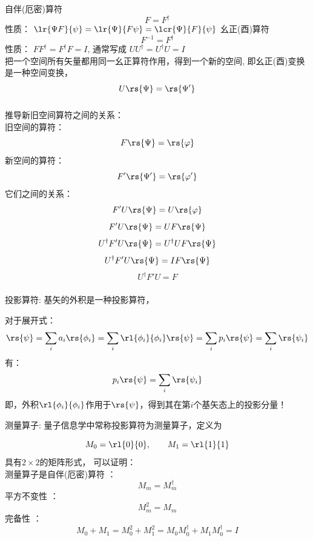 \begin{frame}
    \frametitle{}
    \begin{itemize}
        \Item 自伴(厄密)算符  \[F = F^{\dagger} \] 性质： $\lr{\Psi F}{\psi}=\lr{\Psi }{F \psi}=\lcr{\Psi }{F} {\psi}$
        \Item 幺正(酉)算符    \[F^{-1} = F^{\dagger} \] 性质： $FF^{\dagger}=F^{\dagger}F=I$, 通常写成 $UU^{\dagger}=U^{\dagger}U=I$ \\
        \Tips 把一个空间所有矢量都用同一幺正算符作用，得到一个新的空间, 即幺正(酉)变换是一种空间变换，
        \[U\rs{\Psi} =\rs{\Psi'}\]
    \end{itemize}
\end{frame} 
\begin{frame}
    \frametitle{}
    \Tips 推导新旧空间算符之间的关系： \\
        旧空间的算符： \[F \rs{\Psi}=\rs{\varphi}\]
        新空间的算符： \[F' \rs{\Psi'}=\rs{\varphi'}\]
        它们之间的关系：
        \[F' U\rs{\Psi}=U\rs{\varphi}\]
        \[F' U\rs{\Psi}=UF \rs{\Psi}\]
        \[U^{\dagger}F' U\rs{\Psi}=U^{\dagger}UF \rs{\Psi}\]
        \[U^{\dagger}F' U\rs{\Psi}=IF \rs{\Psi}\]
        \[U^{\dagger}F' U=F \]
\end{frame}

\begin{frame}
    \frametitle{}
    \begin{itemize}
    \Item 投影算符: 基矢的外积是一种投影算符，
    \end{itemize}
    对于展开式： 
    \[\rs{\psi}=\sum_i a_i \rs{\phi_i}=\sum_i \rl{\phi_i}{\phi_i} \rs{\psi}=\sum_i p_i \rs{\psi} =\sum_i \rs{\psi_i}\]
    有：\[p_i \rs{\psi} =\sum_i \rs{\psi_i}\]
    即，外积$\rl{\phi_i}{\phi_i}$作用于$\rs{\psi}$，得到其在第$i$个基矢态上的投影分量！\\
\end{frame}

\begin{frame}    
    \begin{itemize}
        \Item 测量算子: 量子信息学中常称投影算符为测量算子，定义为
        \end{itemize}
    \[M_0=\rl{0}{0}, \qquad M_1=\rl{1}{1} \]
    具有$2\times 2$的矩阵形式，
    可以证明：\\
    {\bullet} 测量算子是自伴(厄密)算符 ：\[M_m = M_m ^{\dagger} \]
    {\bullet} 平方不变性 ：\[M_m ^2 = M_m \]
    {\bullet} 完备性 ：\[M_0 + M_1 = M_0 ^2 + M_1 ^2 = M_0 M_0 ^\dagger + M_1 M_0 ^\dagger=I\]
\end{frame}

